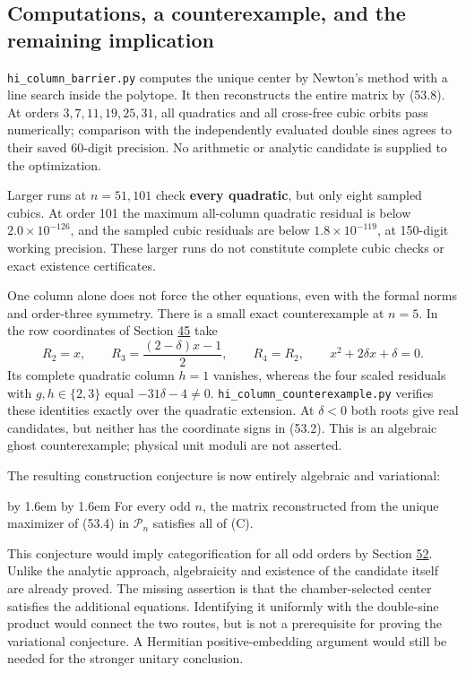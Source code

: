 \documentclass[11pt,reqno]{amsart}
\theoremstyle{plain}
\newenvironment{mdquote}%
  {\par\addvspace{0.5\baselineskip}\begingroup
   \advance\leftskip by 1.6em \advance\rightskip by 1.6em \noindent\ignorespaces}%
  {\par\endgroup\addvspace{0.5\baselineskip}}
\begin{document}
\subsection{Computations, a counterexample, and the remaining implication}\label{sec:53.3}

\texttt{hi\_\allowbreak column\_\allowbreak barrier.py} computes the unique center by Newton's method
with a line search inside the polytope. It then reconstructs the
entire matrix by (53.8). At orders \(3,7,11,19,25,31\), all
quadratics and all cross-free cubic orbits pass numerically; comparison
with the independently evaluated double sines agrees to their saved
60-digit precision. No arithmetic or analytic candidate is supplied
to the optimization.

Larger runs at \(n=51,101\) check \textbf{every quadratic}, but only eight
sampled cubics. At order 101 the maximum all-column quadratic residual
is below \(2.0\times10^{-126}\), and the sampled cubic residuals are
below \(1.8\times10^{-119}\), at 150-digit working precision.
These larger runs do not constitute complete cubic checks or exact
existence certificates.

One column alone does not force the other equations, even with the
formal norms and order-three symmetry. There is a small exact
counterexample at \(n=5\). In the row coordinates of Section \hyperref[sec:45]{45} take
\[
 R_2=x,\qquad R_3=\frac{(2-\delta)x-1}{2},\qquad R_4=R_2,
 \qquad x^2+2\delta x+\delta=0.
\]
Its complete quadratic column \(h=1\) vanishes, whereas the four
scaled residuals with \(g,h\in\{2,3\}\) equal
\(-31\delta-4\ne0\). \texttt{hi\_\allowbreak column\_\allowbreak counterexample.py} verifies these
identities exactly over the quadratic extension. At \(\delta<0\)
both roots give real candidates, but neither has the coordinate signs
in (53.2). This is an algebraic ghost counterexample; physical unit
moduli are not asserted.

The resulting construction conjecture is now entirely algebraic and
variational:

\begin{mdquote}
For every odd \(n\), the matrix reconstructed from the unique
maximizer of (53.4) in \(\mathcal P_n\) satisfies all of (C).
\end{mdquote}

This conjecture would imply categorification for all odd orders by
Section \hyperref[sec:52]{52}. Unlike the analytic approach, algebraicity and existence
of the candidate itself are already proved. The missing assertion is
that the chamber-selected center satisfies the additional equations.
Identifying it uniformly with the double-sine product would connect
the two routes, but is not a prerequisite for proving the variational
conjecture. A Hermitian positive-embedding argument would still be
needed for the stronger unitary conclusion.
\end{document}

